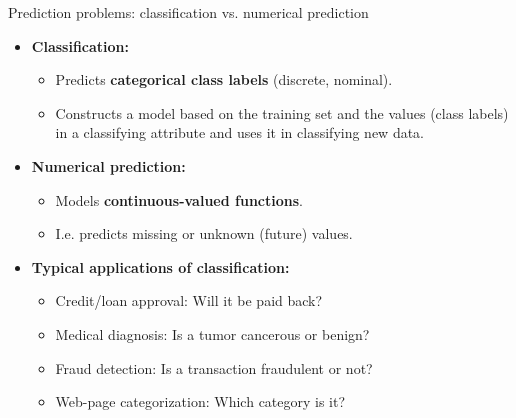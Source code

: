\documentclass[aspectratio=169,t,table]{beamer}
\begin{document}
  {
    \begin{frame}{Prediction problems: classification vs. numerical prediction}
        \begin{itemize}
            \item \textbf{Classification:}
            \begin{itemize}
              \item Predicts \textbf{\color{airforceblue}categorical class labels} (discrete, nominal).
              \item Constructs a model based on the training set and the values (class labels) in a classifying attribute and uses it in classifying new data.
            \end{itemize}
            \item \textbf{Numerical prediction:}
            \begin{itemize}
              \item Models \textbf{\color{airforceblue}continuous-valued functions}.
              \item I.e. predicts missing or unknown (future) values.
            \end{itemize}
            \item \textbf{Typical applications of classification:}
            \begin{itemize}
              \item Credit/loan approval: Will it be paid back?
              \item Medical diagnosis: Is a tumor cancerous or benign?
              \item Fraud detection: Is a transaction fraudulent or not?
              \item Web-page categorization: Which category is it?
            \end{itemize}
        \end{itemize}
    \end{frame}
  }
\end{document}
